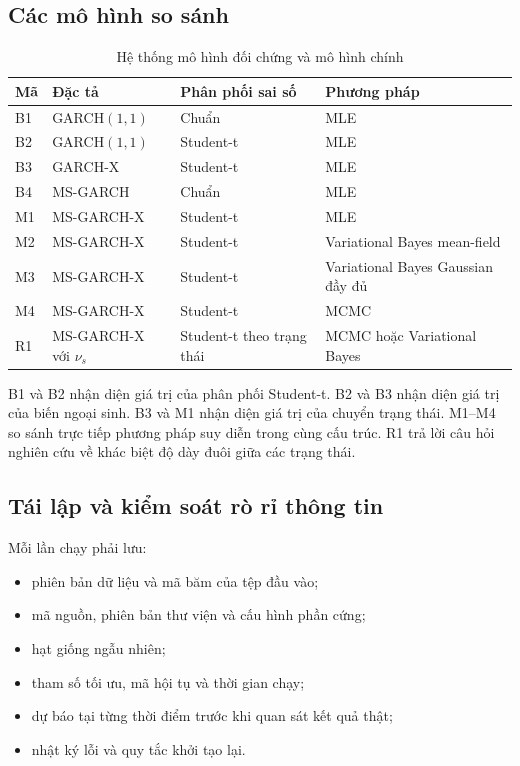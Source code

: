 \documentclass[12pt,a4paper]{article}
\numberwithin{equation}{section}
\begin{document}
\subsection{Các mô hình so sánh}\label{subsec:models}

\begin{table}[H]
\centering
\caption{Hệ thống mô hình đối chứng và mô hình chính}
\label{tab:model-list}
\begin{tabularx}{\textwidth}{p{}Y p{0.20\textwidth}p{0.19\textwidth}}
\toprule
\textbf{Mã} & \textbf{Đặc tả} & \textbf{Phân phối sai số} & \textbf{Phương pháp} \\
\midrule
B1 & GARCH$(1,1)$ & Chuẩn & MLE \\
B2 & GARCH$(1,1)$ & Student-t & MLE \\
B3 & GARCH-X & Student-t & MLE \\
B4 & MS-GARCH & Chuẩn & MLE \\
M1 & MS-GARCH-X & Student-t & MLE \\
M2 & MS-GARCH-X & Student-t & Variational Bayes mean-field \\
M3 & MS-GARCH-X & Student-t & Variational Bayes Gaussian đầy đủ \\
M4 & MS-GARCH-X & Student-t & MCMC \\
R1 & MS-GARCH-X với $\nu_s$ & Student-t theo trạng thái & MCMC hoặc Variational Bayes \\
\bottomrule
\end{tabularx}
\end{table}

B1 và B2 nhận diện giá trị của phân phối Student-t. B2 và B3 nhận diện giá trị của biến ngoại sinh. B3 và M1 nhận diện giá trị của chuyển trạng thái. M1--M4 so sánh trực tiếp phương pháp suy diễn trong cùng cấu trúc. R1 trả lời câu hỏi nghiên cứu về khác biệt độ dày đuôi giữa các trạng thái.

\subsection{Tái lập và kiểm soát rò rỉ thông tin}\label{subsec:reproducibility}

Mỗi lần chạy phải lưu:
\begin{itemize}
  \item phiên bản dữ liệu và mã băm của tệp đầu vào;
  \item mã nguồn, phiên bản thư viện và cấu hình phần cứng;
  \item hạt giống ngẫu nhiên;
  \item tham số tối ưu, mã hội tụ và thời gian chạy;
  \item dự báo tại từng thời điểm trước khi quan sát kết quả thật;
  \item nhật ký lỗi và quy tắc khởi tạo lại.
\end{itemize}
\end{document}
